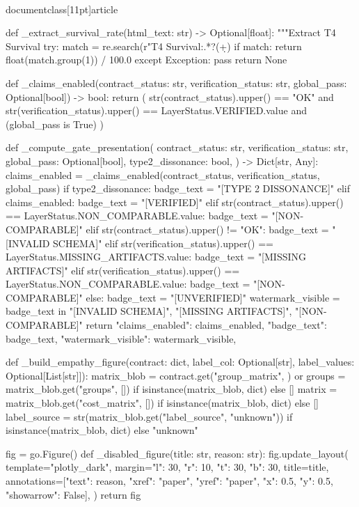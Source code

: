 \\documentclass[11pt]{article}
\begin{document}
\begin{CodeBlock}
{{{{{{{{def _extract_survival_rate(html_text: str) -> Optional[float]:
    """Extract T4 Survival %
    try:
        match = re.search(r"T4 Survival:.*?(\d+)%
        if match:
            return float(match.group(1)) / 100.0
    except Exception:
        pass
    return None


def _claims_enabled(contract_status: str, verification_status: str, global_pass: Optional[bool]) -> bool:
    return (
        str(contract_status).upper() == "OK"
        and str(verification_status).upper() == LayerStatus.VERIFIED.value
        and (global_pass is True)
    )


def _compute_gate_presentation(
    contract_status: str,
    verification_status: str,
    global_pass: Optional[bool],
    type2_dissonance: bool,
) -> Dict[str, Any]:
    claims_enabled = _claims_enabled(contract_status, verification_status, global_pass)
    if type2_dissonance:
        badge_text = "[TYPE 2 DISSONANCE]"
    elif claims_enabled:
        badge_text = "[VERIFIED]"
    elif str(contract_status).upper() == LayerStatus.NON_COMPARABLE.value:
        badge_text = "[NON-COMPARABLE]"
    elif str(contract_status).upper() != "OK":
        badge_text = "[INVALID SCHEMA]"
    elif str(verification_status).upper() == LayerStatus.MISSING_ARTIFACTS.value:
        badge_text = "[MISSING ARTIFACTS]"
    elif str(verification_status).upper() == LayerStatus.NON_COMPARABLE.value:
        badge_text = "[NON-COMPARABLE]"
    else:
        badge_text = "[UNVERIFIED]"
    watermark_visible = badge_text in {"[INVALID SCHEMA]", "[MISSING ARTIFACTS]", "[NON-COMPARABLE]"}
    return {
        "claims_enabled": claims_enabled,
        "badge_text": badge_text,
        "watermark_visible": watermark_visible,
    }


def _build_empathy_figure(contract: dict, label_col: Optional[str], label_values: Optional[List[str]]):
    matrix_blob = contract.get("group_matrix", {}) or {}
    groups = matrix_blob.get("groups", []) if isinstance(matrix_blob, dict) else []
    matrix = matrix_blob.get("cost_matrix", []) if isinstance(matrix_blob, dict) else []
    label_source = str(matrix_blob.get("label_source", "unknown")) if isinstance(matrix_blob, dict) else "unknown"

    fig = go.Figure()
    def _disabled_figure(title: str, reason: str):
        fig.update_layout(
            template="plotly_dark",
            margin={"l": 30, "r": 10, "t": 30, "b": 30},
            title=title,
            annotations=[{"text": reason, "xref": "paper", "yref": "paper", "x": 0.5, "y": 0.5, "showarrow": False}],
        )
        return fig

}}}}}}}}
\end{CodeBlock}
\end{document}
